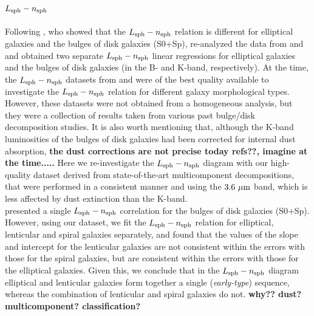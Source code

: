 \documentclass[preprint2]{emulateapj}
\begin{document}
\subsection{$L_{\rm sph} - n_{\rm sph}$}
Following \cite{graham2001}, 
who showed that the $L_{\rm sph} - n_{\rm sph}$ relation is different for elliptical galaxies and the bulges of disk galaxies (S0+Sp), 
\cite{savorgnan2013} re-analyzed the data from \cite{grahamguzman2003} and \cite{graham2013review} 
and obtained two separate $L_{\rm sph} - n_{\rm sph}$ linear regressions for elliptical galaxies and the bulges of disk galaxies 
(in the B- and K-band, respectively). 
At the time, the $L_{\rm sph} - n_{\rm sph}$ datasets from \cite{grahamguzman2003} and \cite{graham2013review} were of the best quality available 
to investigate the $L_{\rm sph} - n_{\rm sph}$ relation for different galaxy morphological types. 
However, these datasets were not obtained from a homogeneous analysis, 
but they were a collection of results taken from various past bulge/disk decomposition studies. 
It is also worth mentioning that, 
although the K-band luminosities of the bulges of disk galaxies had been corrected for internal dust absorption, 
{\bf the dust corrections are not precise today refs??, imagine at the time.....}  
Here we re-investigate the $L_{\rm sph} - n_{\rm sph}$ diagram with our high-quality dataset  
derived from state-of-the-art multicomponent decompositions, 
that were performed in a consistent manner 
and using the $3.6\rm~\mu m$ band, which is less affected by dust extinction than the K-band. \\
\cite{graham2013review} presented a single $L_{\rm sph} - n_{\rm sph}$ correlation for the bulges of disk galaxies (S0+Sp).
However, using our dataset, 
we fit the $L_{\rm sph} - n_{\rm sph}$ relation for elliptical, lenticular and spiral galaxies separately, 
and found that the values of the slope and intercept for the lenticular galaxies 
are not consistent within the errors with those for the spiral galaxies, 
but are consistent within the errors with those for the elliptical galaxies.  
Given this, we conclude that in the $L_{\rm sph} - n_{\rm sph}$ diagram 
elliptical and lenticular galaxies form together a single (\emph{early-type}) sequence, 
whereas the combination of lenticular and spiral galaxies do not. 
{\bf why?? dust? multicomponent? classification?}
 
\end{document}
